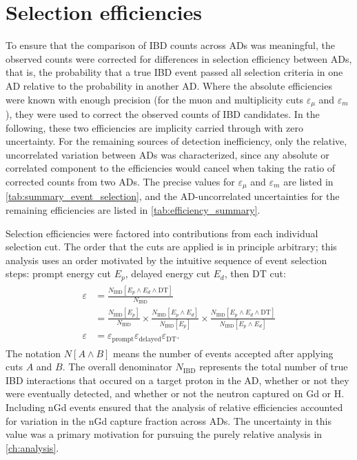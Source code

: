 \section{Selection efficiencies}
\label{sec:efficiencies}

To ensure that the comparison of IBD counts across ADs was meaningful,
the observed counts were corrected
for differences in selection efficiency between ADs,
that is, the probability that a true IBD event
passed all selection criteria in one AD
relative to the probability in another AD.
Where the absolute efficiencies were known with enough precision
(for the muon and multiplicity cuts $\varepsilon_\mu$ and $\varepsilon_m$),
they were used to correct the observed counts of IBD candidates.
In the following, these two efficiencies are implicity carried through
with zero uncertainty.
For the remaining sources of detection inefficiency,
only the relative, uncorrelated variation between ADs was characterized,
since any absolute or correlated component to the efficiencies
would cancel when taking the ratio of corrected counts from two ADs.
The precise values for $\varepsilon_\mu$ and $\varepsilon_m$
are listed in \cref{tab:summary_event_selection},
and the AD-uncorrelated uncertainties for the remaining efficiencies
are listed in \cref{tab:efficiency_summary}.

Selection efficiencies were factored into
contributions from each individual selection cut.
The order that the cuts are applied is in principle arbitrary;
this analysis uses an order
motivated by the intuitive sequence of event selection steps:
prompt energy cut $E_p$, delayed energy cut $E_d$, then DT cut:
\begin{align}\label{eq:efficiency_def}
    \begin{split}
        \varepsilon &= \frac{N_\text{IBD}[E_p \wedge E_d \wedge \text{DT}]}{
            N_\text{IBD}
        } \\
                    &= \frac{N_\text{IBD}[E_p]}{N_\text{IBD}} \times
                    \frac{N_\text{IBD}[E_p \wedge E_d]}{
                        N_\text{IBD}[E_p]
                    } \times
                    \frac{N_\text{IBD}[E_p \wedge E_d \wedge \text{DT}]}{
                        N_\text{IBD}[E_p \wedge E_d]
                    } \\
        \varepsilon &= \varepsilon_\text{prompt}\varepsilon_\text{delayed}
        \varepsilon_\text{DT}.
    \end{split}
\end{align}
The notation $N[A \wedge B]$ means
the number of events accepted after applying cuts $A$ and $B$.
The overall denominator $N_\text{IBD}$
represents the total number of true IBD interactions
that occured on a target proton in the AD,
whether or not they were eventually detected,
and whether or not the neutron captured on Gd or H.
Including nGd events ensured that the analysis of relative efficiencies
accounted for variation in the nGd capture fraction across ADs.
The uncertainty in this value was a primary motivation
for pursuing the purely relative analysis in \cref{ch:analysis}.

